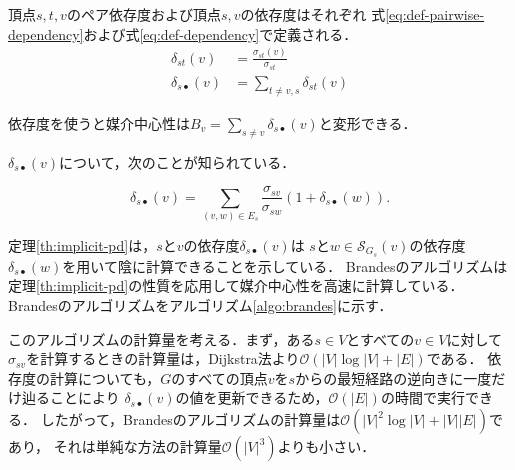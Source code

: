 \begin{definition}
  \label{def:pairwise-dependency}
  頂点$s,t,v$のペア依存度および頂点$s,v$の依存度はそれぞれ
  式\eqref{eq:def-pairwise-dependency}および式\eqref{eq:def-dependency}で定義される．
  \begin{align}
      \delta_{st}(v)&=\frac{\sigma_{st}(v)}{\sigma_{st}}
      \label{eq:def-pairwise-dependency} \\
      \delta_{s\bullet}(v)&=\sum_{t\neq v,s}\delta_{st}(v)
      \label{eq:def-dependency}
  \end{align}
\end{definition}

依存度を使うと媒介中心性は$B_v=\sum_{s\neq v}\delta_{s\bullet}(v)$と変形できる．

$\delta_{s\bullet}(v)$について，次のことが知られている．
\begin{theorem}
  \label{th:implicit-pd}
  \begin{equation}
    \label{eq:implicit-pd}
    \delta_{s\bullet}(v)=\sum_{(v,w)\in E_s}\frac{\sigma_{sv}}{\sigma_{sw}}(1+\delta_{s\bullet}(w)).
  \end{equation}
\end{theorem}

定理\ref{th:implicit-pd}は，$s$と$v$の依存度$\delta_{s\bullet}(v)$は
$s$と$w\in\mathcal{S}_{G_s}(v)$の依存度$\delta_{s\bullet}(w)$を用いて陰に計算できることを示している．
Brandesのアルゴリズムは定理\ref{th:implicit-pd}の性質を応用して媒介中心性を高速に計算している．
Brandesのアルゴリズムをアルゴリズム\ref{algo:brandes}に示す．

このアルゴリズムの計算量を考える．まず，ある$s\in V$とすべての$v\in V$に対して
$\sigma_{sv}$を計算するときの計算量は，Dijkstra法より$\mathcal{O}(|V|\log |V|+|E|)$である．
依存度の計算についても，$G$のすべての頂点$v$を$s$からの最短経路の逆向きに一度だけ辿ることにより
$\delta_{s\bullet}(v)$の値を更新できるため，$\mathcal{O}(|E|)$の時間で実行できる\cite{Brandes2001}．
したがって，Brandesのアルゴリズムの計算量は$\mathcal{O}(|V|^2\log |V|+|V||E|)$であり，
それは単純な方法の計算量$\mathcal{O}(|V|^3)$よりも小さい．

